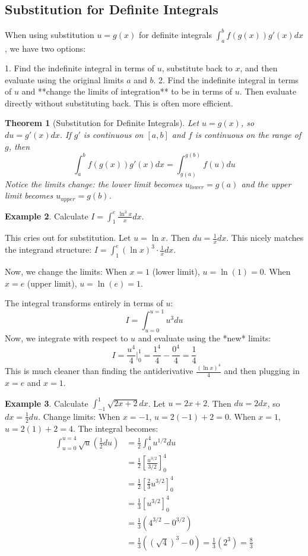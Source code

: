 \documentclass[11pt]{article}
\newtheorem{theorem}{Theorem}[section]
\theoremstyle{definition}
\newtheorem{example}[theorem]{Example}
\theoremstyle{remark} %
\begin{document}
\subsection{Substitution for Definite Integrals}

When using substitution $u = g(x)$ for definite integrals $\int_a^b f(g(x)) g'(x) dx$, we have two options:

1.  Find the indefinite integral in terms of $u$, substitute back to $x$, and then evaluate using the original limits $a$ and $b$.
2.  Find the indefinite integral in terms of $u$ and **change the limits of integration** to be in terms of $u$. Then evaluate directly without substituting back. This is often more efficient.

\begin{theorem}[Substitution for Definite Integrals]
Let $u = g(x)$, so $du = g'(x) dx$. If $g'$ is continuous on $[a, b]$ and $f$ is continuous on the range of $g$, then
\[
\int_a^b f(g(x)) g'(x) dx = \int_{g(a)}^{g(b)} f(u) du
\]
Notice the limits change: the lower limit becomes $u_{lower} = g(a)$ and the upper limit becomes $u_{upper} = g(b)$.
\end{theorem}

\begin{example}
Calculate $I = \int_1^e \frac{\ln^3 x}{x} dx$.

This cries out for substitution. Let $u = \ln x$. Then $du = \frac{1}{x} dx$. This nicely matches the integrand structure: $I = \int_1^e (\ln x)^3 \cdot \frac{1}{x} dx$.

Now, we change the limits:
When $x=1$ (lower limit), $u = \ln(1) = 0$.
When $x=e$ (upper limit), $u = \ln(e) = 1$.

The integral transforms entirely in terms of $u$:
\[
I = \int_{u=0}^{u=1} u^3 du
\]
Now, we integrate with respect to $u$ and evaluate using the *new* limits:
\[
I = \frac{u^4}{4} \bigg|_0^1 = \frac{1^4}{4} - \frac{0^4}{4} = \frac{1}{4}
\]
This is much cleaner than finding the antiderivative $\frac{(\ln x)^4}{4}$ and then plugging in $x=e$ and $x=1$.
\end{example}

\begin{example}
Calculate $\int_{-1}^1 \sqrt{2x+2} dx$.
Let $u = 2x+2$. Then $du = 2 dx$, so $dx = \frac{1}{2} du$.
Change limits:
When $x=-1$, $u = 2(-1)+2 = 0$.
When $x=1$, $u = 2(1)+2 = 4$.
The integral becomes:
\begin{align*} \int_{u=0}^{u=4} \sqrt{u} \left(\frac{1}{2} du\right) &= \frac{1}{2} \int_0^4 u^{1/2} du \\ &= \frac{1}{2} \left[ \frac{u^{3/2}}{3/2} \right]_0^4 \\ &= \frac{1}{2} \left[ \frac{2}{3} u^{3/2} \right]_0^4 \\ &= \frac{1}{3} \left[ u^{3/2} \right]_0^4 \\ &= \frac{1}{3} (4^{3/2} - 0^{3/2}) \\ &= \frac{1}{3} ((\sqrt{4})^3 - 0) = \frac{1}{3} (2^3) = \frac{8}{3} \end{align*}
\end{example}
\end{document}
